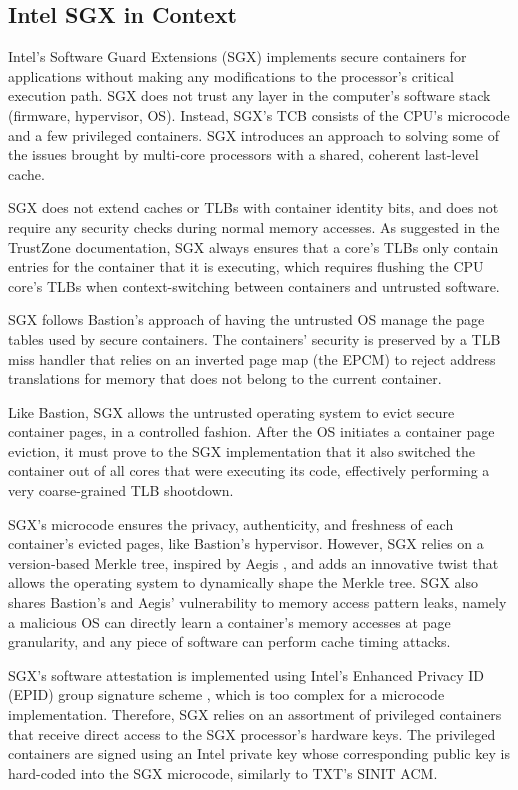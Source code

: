 \subsection{Intel SGX in Context}

Intel's Software Guard Extensions (SGX) \cite{mckeen2013sgx, anati2013sgx,
hoekstra2013sgx} implements secure containers for applications without making
any modifications to the processor's critical execution path. SGX does not
trust any layer in the computer's software stack (firmware, hypervisor, OS).
Instead, SGX's TCB consists of the CPU's microcode and a few privileged
containers. SGX introduces an approach to solving some of the issues brought by
multi-core processors with a shared, coherent last-level cache.

SGX does not extend caches or TLBs with container identity bits, and does not
require any security checks during normal memory accesses. As suggested in the
TrustZone documentation, SGX always ensures that a core's TLBs only contain
entries for the container that it is executing, which requires flushing the CPU
core's TLBs when context-switching between containers and untrusted software.

SGX follows Bastion's approach of having the untrusted OS manage the page
tables used by secure containers. The containers' security is preserved by a
TLB miss handler that relies on an inverted page map (the EPCM) to reject
address translations for memory that does not belong to the current container.

Like Bastion, SGX allows the untrusted operating system to evict secure
container pages, in a controlled fashion. After the OS initiates a container
page eviction, it must prove to the SGX implementation that it also switched
the container out of all cores that were executing its code, effectively
performing a very coarse-grained TLB shootdown.

SGX's microcode ensures the privacy, authenticity, and freshness of each
container's evicted pages, like Bastion's hypervisor. However, SGX relies on a
version-based Merkle tree, inspired by Aegis \cite{suh2003aegis}, and adds an innovative twist
that allows the operating system to dynamically shape the Merkle tree. SGX also
shares Bastion's and Aegis' vulnerability to memory access pattern leaks, namely a
malicious OS can directly learn a container's memory accesses at page
granularity, and any piece of software can perform cache timing attacks.

SGX's software attestation is implemented using Intel's Enhanced Privacy ID
(EPID) group signature scheme \cite{brickell2009epid}, which is too complex for
a microcode implementation. Therefore, SGX relies on an assortment of
privileged containers that receive direct access to the SGX processor's
hardware keys. The privileged containers are signed using an Intel private key
whose corresponding public key is hard-coded into the SGX microcode, similarly
to TXT's SINIT ACM.

